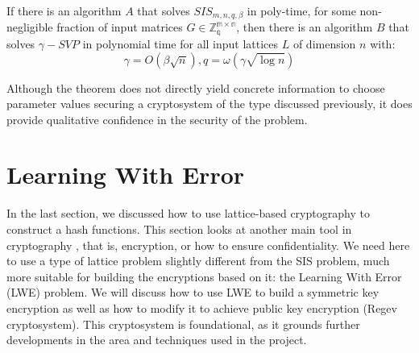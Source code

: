 \begin{theorem}
   If there is an algorithm $A$ that solves
  $SIS_{m,n,q,\beta}$ in poly-time, for some non-negligible fraction of input
  matrices $G \in \mathbb{Z_q^{m \times n}}$, then there is an algorithm $B$
  that solves $\gamma-SVP$ in polynomial time for all input lattices $L$ of
  dimension $n$ with:
  \[
    \gamma = O(\beta\sqrt{n}), q = \omega(\gamma\sqrt{\log n})
  \]
  \label{theo:AjtaiHardness}
\end{theorem}

Although the theorem does not directly yield concrete information to choose
parameter values securing a cryptosystem of the type discussed previously, it does provide  qualitative confidence in the security of the problem.

\section{Learning With Error}
\label{sub:LWE}
In the last section, we discussed how to use lattice-based cryptography to
construct a hash functions. This section looks at another main tool in
cryptography , that is, encryption, or how to ensure confidentiality. We need here to
use a type of lattice problem slightly different from the SIS problem, much more suitable for building the encryptions based on it: the Learning With Error (LWE) problem. We will discuss how to use LWE to build a symmetric key encryption as well as how to modify it to achieve public key encryption (Regev cryptosystem). This cryptosystem is foundational, as it grounds further developments in the area and techniques used in the project.

